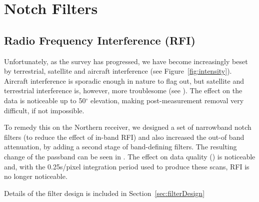\section{Notch Filters}
\subsection{Radio Frequency Interference (RFI)}

Unfortunately, as the survey has progressed, we have become increasingly beset
by terrestrial, satellite and aircraft interference (see Figure~\ref{fig:intensity}). Aircraft interference is
sporadic enough in nature to flag out, but satellite and terrestrial interference is, however, more troublesome (see ). The effect on the data is noticeable up to 50$^{\circ}$ elevation, making post-measurement removal very difficult, if not impossible.

 To remedy this on the Northern receiver, we designed a set of narrowband notch filters (to reduce the effect of in-band RFI) and also increased the out-of band attenuation, by adding a second stage of band-defining filters. The resulting change of the passband can be seen in . The effect on data quality () is noticeable and, with the 0.25s/pixel integration period used to produce these scans, RFI is no longer noticeable.

Details of the filter design is included in Section~\ref{sec:filterDesign}

